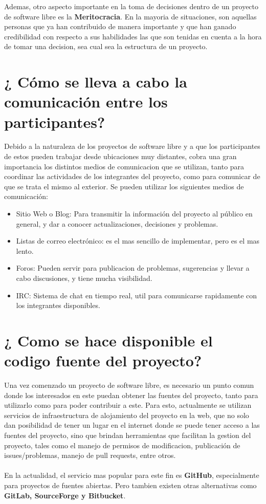 Ademas, otro aspecto importante en la toma de decisiones dentro de un proyecto de software libre es la {\bf Meritocracia}. En la mayoria de situaciones, son aquellas personas que ya han contribuido de manera importante y que han ganado credibilidad con respecto a sus habilidades las que son tenidas en cuenta a la hora de tomar una decision, sea cual sea la estructura de un proyecto.


\section{¿ Cómo se lleva a cabo la comunicación entre los participantes?}

Debido a la naturaleza de los proyectos de software libre y a que los participantes de estos pueden trabajar desde ubicaciones muy distantes, cobra una gran importancia los distintos medios de comunicacion que se utilizan, tanto para coordinar las actividades de los integrantes del proyecto, como para comunicar de que se trata el mismo al exterior.
Se pueden utilizar los siguientes medios de comunicación: 

\begin{itemize}
     \item Sitio Web o Blog: Para transmitir la información del proyecto al público en general, y dar a conocer actualizaciones, decisiones y problemas.
     \item Listas de correo electrónico: es el mas sencillo de implementar, pero es el mas lento.
     \item Foros: Pueden servir para publicacion de problemas, sugerencias y llevar a cabo discusiones, y tiene mucha visibilidad.
     \item IRC: Sistema de chat en tiempo real, util para comunicarse rapidamente con los integrantes disponibles.
\end{itemize}

\section{¿ Como se hace disponible el codigo fuente del proyecto?}

Una vez comenzado un proyecto de software libre, es necesario un punto comun donde los interesados en este puedan obtener las fuentes del proyecto, tanto para utilizarlo como para poder contribuir a este.
Para esto, actualmente se utilizan servicios de infraestructura de alojamiento del proyecto en la web, que no solo dan posibilidad de tener un lugar en el internet donde se puede tener acceso a las fuentes del proyecto, sino que brindan herramientas que facilitan la gestion del proyecto, tales como el manejo de permisos de modificacion, publicación de issues/problemas, manejo de pull requests, entre otros.
\\
\\
En la actualidad, el servicio mas popular para este fin es {\bf GitHub}, especialmente para proyectos de fuentes abiertas. Pero tambien existen otras alternativas como {\bf GitLab, SourceForge y Bitbucket}.

